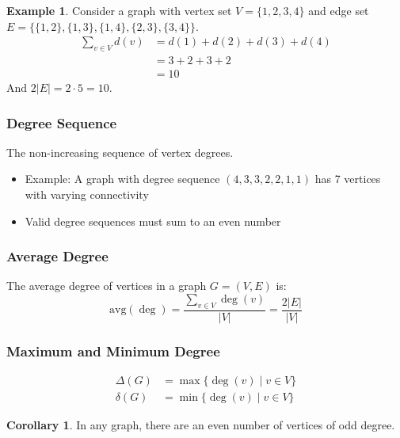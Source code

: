 \documentclass{article}
\theoremstyle{definition}
\newtheorem{example}{Example}
\newtheorem{corollary}{Corollary}
\begin{document}
\begin{example}
Consider a graph with vertex set $V = \{1, 2, 3, 4\}$ and edge set $E = \{\{1,2\}, \{1,3\}, \{1,4\}, \{2,3\}, \{3,4\}\}$.
\begin{align*}
\sum_{v \in V} d(v) &= d(1) + d(2) + d(3) + d(4)\\
&= 3 + 2 + 3 + 2\\
&= 10
\end{align*}
And $2|E| = 2 \cdot 5 = 10$.
\end{example}

\subsubsection{Degree Sequence}
The non-increasing sequence of vertex degrees.
\begin{itemize}
    \item Example: A graph with degree sequence $(4,3,3,2,2,1,1)$ has 7 vertices with varying connectivity
    \item Valid degree sequences must sum to an even number
\end{itemize}
\subsubsection{Average Degree}
The average degree of vertices in a graph $G = (V,E)$ is:
\begin{equation}
\text{avg}(\deg) = \frac{\sum_{v \in V} \deg(v)}{|V|} = \frac{2|E|}{|V|}
\end{equation}
\subsubsection{Maximum and Minimum Degree}
\begin{align}
\Delta(G) &= \max\{\deg(v) \mid v \in V\} \\
\delta(G) &= \min\{\deg(v) \mid v \in V\}
\end{align}
\begin{corollary}
In any graph, there are an even number of vertices of odd degree.
\end{corollary}
\end{document}
